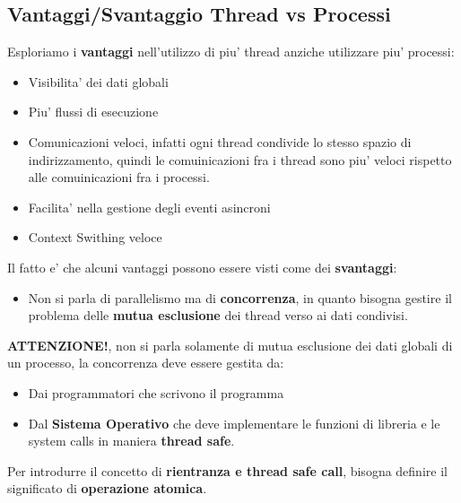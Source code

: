 \documentclass{article}
\begin{document}
    \subsection{Vantaggi/Svantaggio Thread vs Processi}
    Esploriamo i \textbf{vantaggi} nell'utilizzo di piu' thread
    anziche utilizzare piu' processi:
    \begin{itemize}
       \item Visibilita' dei dati globali
       \item Piu' flussi di esecuzione  
       \item Comunicazioni veloci, infatti ogni thread condivide lo 
        stesso spazio di indirizzamento, quindi le comuinicazioni fra i
        thread sono piu' veloci rispetto alle comuinicazioni fra i processi.
       \item Facilita' nella gestione degli eventi asincroni
       \item Context Swithing veloce 
    \end{itemize}
    Il fatto e' che alcuni vantaggi possono essere visti come dei \textbf{svantaggi}:
    \begin{itemize}
       \item Non si parla di parallelismo ma di \textbf{concorrenza},
        in quanto bisogna gestire il problema delle \textbf{mutua 
        esclusione} dei thread verso ai dati condivisi.
    \end{itemize}
    \textbf{ATTENZIONE!}, non si parla solamente di mutua esclusione dei
    dati globali di un processo, la concorrenza deve essere gestita da:
    \begin{itemize}
       \item Dai programmatori che scrivono il programma 
       \item Dal \textbf{Sistema Operativo} che deve implementare le 
        funzioni di libreria e le system calls in maniera \textbf{thread safe}.
    \end{itemize}
    Per introdurre il concetto di \textbf{rientranza e thread safe call},
    bisogna definire il significato di \textbf{operazione atomica}.
\end{document}
